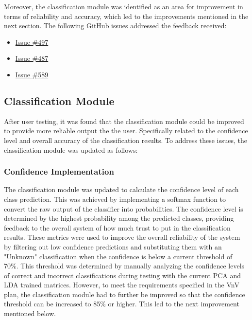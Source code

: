 \documentclass[12pt, titlepage]{article}
\begin{document}
Moreover, the classification module was identified as an area for improvement in
terms of reliability and accuracy, which led to the improvements mentioned in
the next section. The following GitHub issues addressed the feedback received:

\begin{itemize}
    \item \href{https://github.com/Team6-SixSense/audio360/issues/497}{Issue
    \#497}
    \item \href{https://github.com/Team6-SixSense/audio360/issues/487}{Issue
    \#487}
    \item \href{https://github.com/Team6-SixSense/audio360/issues/589}{Issue
    \#589}
\end{itemize}

\subsection{Classification Module}
After user testing, it was found that the classification module could be
improved to provide more reliable output the the user. Specifically related to
the confidence level and overall accuracy of the classification results. To
address these issues, the classification module was updated as follows:

\subsubsection{Confidence Implementation}
The classification module was updated to calculate the confidence level of each
class prediction. This was achieved by implementing a softmax function to
convert the raw output of the classifier into probabilities. The confidence
level is determined by the highest probability among the predicted classes,
providing feedback to the overall system of how much trust to put in the
classification results. These metrics were used to improve the overall
reliability of the system by filtering out low confidence predictions and
substituting them with an "Unknown" classification when the confidence is below
a current threshold of 70\%. This threshold was determined by manually analyzing
the confidence levels of correct and incorrect classifications during testing
with the current PCA and LDA trained matrices. However, to meet the requirements
specified in the VnV plan, the classification module had to further be improved
so that the confidence threshold can be increased to 85\% or higher. This led to
the next improvement mentioned below. 
\end{document}
